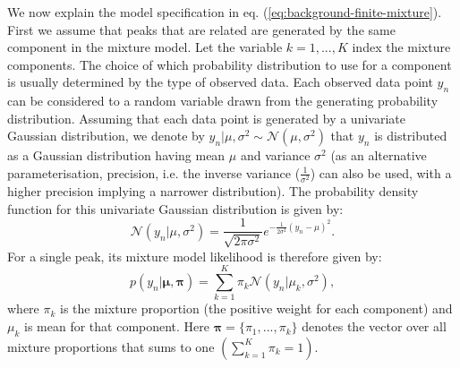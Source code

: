 We now explain the model specification in eq. (\ref{eq:background-finite-mixture}). First we assume that peaks that are related are generated by the same component in the mixture model. Let the variable $k=1,...,K$ index the mixture components. The choice of which probability distribution to use for a component is usually determined by the type of observed data. Each observed data point $y_n$ can be considered to a random variable drawn from the generating probability distribution. Assuming that each data point is generated by a univariate Gaussian distribution, we denote by $y_n \vert \mu, \sigma^2 \sim \mathcal{N}(\mu, \sigma^2)$ that $y_n$ is distributed as a Gaussian distribution having mean $\mu$ and variance $\sigma^2$ (as an alternative parameterisation, precision, i.e. the inverse variance ($\frac{1}{\sigma^2}$) can also be used, with a higher precision implying a narrower distribution). The probability density function for this univariate Gaussian distribution is given by:
\begin{equation}
\mathcal{N}(y_n \vert \mu, \sigma^2) = \frac{1}{\sqrt{2\pi\sigma^2}}e^{-\frac{1}{2\sigma^2}(y_n-\mu)^2}.
\end{equation}
For a single peak, its mixture model likelihood is therefore given by:
\begin{equation}
p(y_n \vert \boldsymbol{\mu},\boldsymbol{\pi}) = \sum_{k=1}^{K} \pi_k \mathcal{N}(y_n \vert \mu_k,\sigma^2),
\end{equation}
where $\pi_k$ is the mixture proportion (the positive weight for each component) and $\mu_k$ is mean for that component. Here $\boldsymbol{\pi}=\{\pi_{1},...,\pi_{k}\}$ denotes the vector over all mixture proportions that sums to one $\left(\sum_{k=1}^{K}\pi_{k}=1\right)$. 

